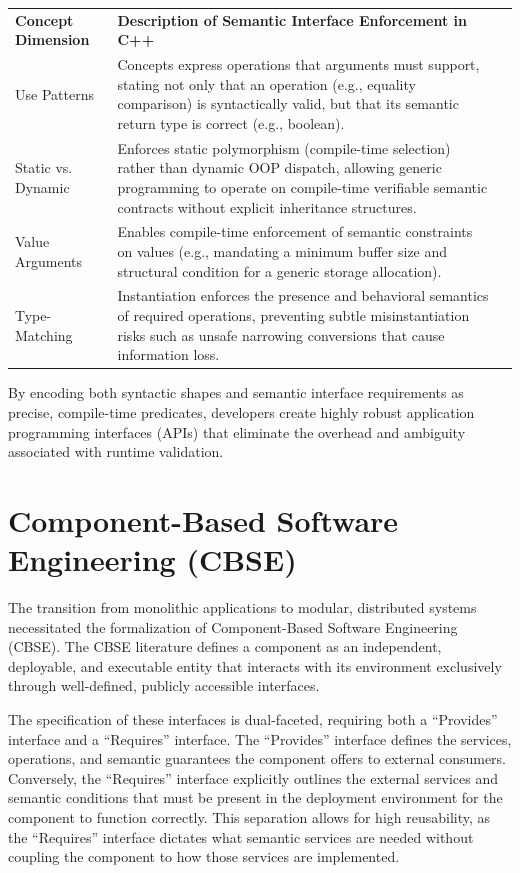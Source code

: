 \documentclass[11pt,letterpaper]{article}
\newcommand{\headingfont}{\sffamily}
\begin{document}
\begin{multicols*}{2}
\begingroup
\renewcommand{\arraystretch}{1.5}
\begin{tabularx}{\columnwidth}{@{}P{0.3\columnwidth}YY@{}}
    \headingfont\bfseries Concept Dimension & \headingfont\bfseries Description of Semantic Interface Enforcement in C++ \\
    \addlinespace[4pt]
    Use Patterns & Concepts express operations that arguments must support, stating not only that an operation (e.g., equality comparison) is syntactically valid, but that its semantic return type is correct (e.g., boolean). \\
    \addlinespace[4pt]
    Static vs. Dynamic & Enforces static polymorphism (compile-time selection) rather than dynamic OOP dispatch, allowing generic programming to operate on compile-time verifiable semantic contracts without explicit inheritance structures. \\
    \addlinespace[4pt]
    Value Arguments & Enables compile-time enforcement of semantic constraints on values (e.g., mandating a minimum buffer size and structural condition for a generic storage allocation). \\
    \addlinespace[4pt]
    Type-Matching & Instantiation enforces the presence and behavioral semantics of required operations, preventing subtle misinstantiation risks such as unsafe narrowing conversions that cause information loss. \\
\end{tabularx}
\label{tab:table1}
\endgroup
By encoding both syntactic shapes and semantic interface requirements as precise, compile-time predicates, developers create highly robust application programming interfaces (APIs) that eliminate the overhead and ambiguity associated with runtime validation.

\section{Component-Based Software Engineering (CBSE)}
The transition from monolithic applications to modular, distributed systems necessitated the formalization of Component-Based Software Engineering (CBSE). The CBSE literature defines a component as an independent, deployable, and executable entity that interacts with its environment exclusively through well-defined, publicly accessible interfaces.

The specification of these interfaces is dual-faceted, requiring both a ``Provides'' interface and a ``Requires'' interface. The ``Provides'' interface defines the services, operations, and semantic guarantees the component offers to external consumers. Conversely, the ``Requires'' interface explicitly outlines the external services and semantic conditions that must be present in the deployment environment for the component to function correctly. This separation allows for high reusability, as the ``Requires'' interface dictates what semantic services are needed without coupling the component to how those services are implemented.


\end{multicols*}
\end{document}
